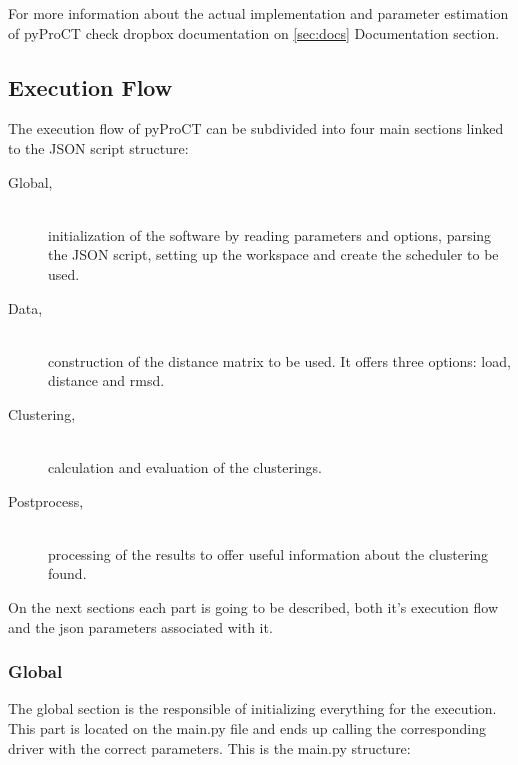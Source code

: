 For more information about the actual implementation and parameter estimation of pyProCT check dropbox documentation on \ref{sec:docs} Documentation section.

\subsection{Execution Flow}
\label{sec:execution_flow}

The execution flow of pyProCT can be subdivided into four main sections linked to the JSON script structure:

\begin{description}
\item [Global,] \hfill \\ initialization of the software by reading parameters and options, parsing the JSON script, setting up the workspace and create the scheduler to be used.
\item [Data,] \hfill \\ construction of the distance matrix to be used. It offers three options: load, distance and rmsd.
\item [Clustering,] \hfill \\ calculation and evaluation of the clusterings.
\item [Postprocess,] \hfill \\ processing of the results to offer useful information about the clustering found.
\end{description}

On the next sections each part is going to be described, both it's execution flow and the json parameters associated with it.

\subsubsection{Global}

The global section is the responsible of initializing everything for the execution. This part is located on the main.py file and ends up calling the corresponding driver with the correct parameters. This is the main.py structure:

